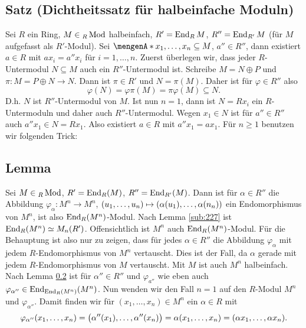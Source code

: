 \subsection{Satz (Dichtheitssatz für halbeinfache Moduln)} %
\label{sub:319}
Sei $R$ ein Ring, $M \in {_R\Mod}$ halbeinfach, $R' = \End_R M$, $R'' = \End_{R'} M$  
(für $M$ aufgefasst als $R'$-Modul). Sei $\set{x_1, \ldots , x_n} \subseteq M$,
$a'' \in R''$, dann existiert $a \in R$ mit $a x_i = a'' x_i$ für $i=1, \ldots ,n$.
Zuerst überlegen wir, dass jeder $R$-Untermodul $N \subseteq M$ auch ein $R''$-Untermodul ist. Schreibe $M= N \oplus P$ und $\pi : M = P \oplus N \to N$. Dann ist
$\pi \in R'$ und $N = \pi(M)$. Daher ist für $\varphi \in R''$ also 
\[
	\varphi(N)= \varphi \pi (M) = \pi  \varphi(M) \subseteq N.
\]
D.h. $N$ ist $R''$-Untermodul von $M$. Ist nun $n=1$, dann ist $N= R x_i$ ein $R$-Untermoduln und daher auch $R''$-Untermodul. Wegen $x_1 \in N$ ist für $a'' \in R''$
auch $a'' x_1 \in N= R x_1$. Also existiert $a \in R$ mit $a'' x_1 = a x_1$. Für $n\ge 1$ benutzen wir folgenden Trick:

\subsection{Lemma} %
\label{sub:320}
Sei $M \in {_R\Mod}$, $R' = \End_R(M)$, $R'' = \End_{R'}(M)$. Dann ist für $\alpha \in R''$ die Abbildung $\varphi_\alpha : M^n  \to M^n$, 
$(u_1, \ldots ,u_n)  \mapsto \enbrace*{\alpha(u_1), \ldots , \alpha(n_n)} $ ein Endomorphismus von $M^n$, ist also $\End_R(M^n)$-Modul.
Nach Lemma \ref{sub:227} ist $\End_R(M^n) \simeq M_n(R')$. Offensichtlich ist $M^n$ auch $\End_R(M^n)$-Modul. Für die Behauptung ist also nur zu zeigen, dass für jedes 
$\alpha \in R''$ die Abbildung $\varphi_\alpha$ mit jedem $R$-Endomorphismus von $M^n$ vertauscht. Dies ist der Fall, da $\alpha$ gerade mit jedem $R$-Endomorphismus von 
$M$ vertauscht. \bewende
{}
Mit $M$ ist auch $M^n$ halbeinfach. Nach Lemma \ref{sub:320} ist für $\alpha'' \in R''$ und $\varphi_{a''}$ wie eben auch $\varphi_{\alpha''} \in \End_{\End_R(M^n)} (M^n)$.
Nun wenden wir den Fall $n=1$ auf den $R$-Modul $M^n$ und $\varphi_{\alpha''}$. Damit finden wir für $(x_1, \ldots , x_n) \in M^n$ ein $\alpha \in R$ mit 
\[
	\varphi_{\alpha''}(x_1, \ldots , x_n)= \enbrace[\big]{\alpha''(x_1), \ldots , \alpha''(x_n)} = \alpha (x_1, \ldots , x_n) = (\alpha x_1, \ldots , \alpha x_n).
\]
\newpage

